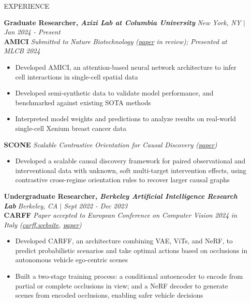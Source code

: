\documentclass{resume} %
\begin{document}
\begin{rSection}{EXPERIENCE}

\textbf{Graduate Researcher, \textit{Azizi Lab at Columbia University}} \hfill {\it New York, NY} \(|\) {\it Jan 2024 - Present}\\
\textbf{AMICI} 
\textit{Submitted to Nature Biotechnology (\href{https://www.biorxiv.org/content/10.1101/2025.09.22.677860v1}{paper} in review); Presented at MLCB 2024}
\begin{itemize}
    \itemsep -0.5em \vspace{-0.5em}
    \item Developed AMICI, an attention-based neural network architecture to infer cell interactions in single-cell spatial data
    \item Developed semi-synthetic data to validate model performance, and benchmarked against existing SOTA methods 
    \item Interpreted model weights and predictions to analyze results on real-world single-cell Xenium breast cancer data
\end{itemize}
\textbf{SCONE} \textit{Scalable Contrastive Orientation for Causal Discovery (\href{https://arxiv.org/abs/2603.03411v1}{paper})}
\begin{itemize}
    \itemsep -0.5em \vspace{-0.5em}
    \item Developed a scalable causal discovery framework for paired observational and interventional data with unknown, soft multi-target intervention effects, using contrastive cross-regime orientation rules to recover larger causal graphs
\end{itemize}

\textbf{Undergraduate Researcher, \textit{Berkeley Artificial Intelligence Research Lab}} \hfill {\it Berkeley, CA} \(|\) {\it Sept 2022 - Dec 2023}\\
\textbf{CARFF} \textit{Paper accepted to European Conference on Computer Vision 2024 in Italy (\href{carff.website}{carff.website}, \href{https://link.springer.com/chapter/10.1007/978-3-031-73024-5_14}{paper})}
\begin{itemize}
    \itemsep -0.5em \vspace{-0.5em}
    \item Developed CARFF, an architecture combining VAE, ViTs, and NeRF, to predict probabilistic scenarios and take optimal actions based on occlusions in autonomous vehicle ego-centric scenes
    \item Built a two-stage training process: a conditional autoencoder to encode from partial or complete occlusions in view; and a NeRF decoder to generate scenes from encoded occlusions, enabling safer vehicle decisions
\end{itemize}


\end{rSection}
\end{document}

